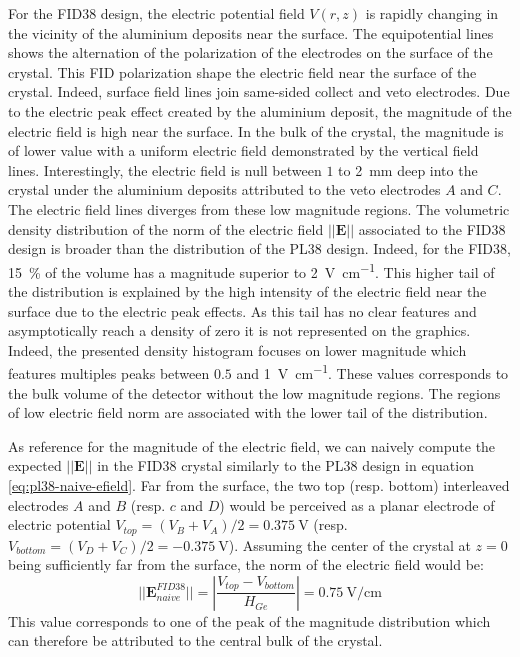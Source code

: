 For the FID38 design, the electric potential field $V(r,z)$ is rapidly changing in the vicinity of the aluminium deposits near the surface. The equipotential lines shows the alternation of the polarization of the electrodes on the surface of the crystal. This FID polarization shape the electric field near the surface of the crystal. Indeed, surface field lines join same-sided collect and veto electrodes. Due to the electric peak effect created by the aluminium deposit, the magnitude of the electric field is high near the surface. In the bulk of the crystal, the magnitude is of lower value with a uniform electric field demonstrated by the vertical field lines. Interestingly, the electric field is null between $1$ to \SI{2}{\mm} deep into the crystal under the aluminium deposits attributed to the veto electrodes $A$ and $C$. The electric field lines diverges from these low magnitude regions.
The volumetric density distribution of the norm of the electric field $||\bm{E}||$ associated to the FID38 design is broader than the distribution of the PL38 design. Indeed, for the FID38, \SI{15}{\percent} of the volume has a magnitude superior to \SI{2}{\volt\per\cm}. This higher tail of the distribution is explained by the high intensity of the electric field near the surface due to the electric peak effects. As this tail has no clear features and asymptotically reach a density of zero it is not represented on the graphics. Indeed, the presented density histogram focuses on lower magnitude which features multiples peaks between $0.5$ and \SI{1}{\volt\per\cm}. These values corresponds to the bulk volume of the detector without the low magnitude regions. The regions of low electric field norm are associated with the lower tail of the distribution.

As reference for the magnitude of the electric field, we can naively compute the expected $||\bm{E}||$ in the FID38 crystal similarly to the PL38 design in equation \ref{eq:pl38-naive-efield}. Far from the surface, the two top (resp. bottom) interleaved electrodes $A$ and $B$ (resp. $c$ and $D$) would be perceived as a planar electrode of electric potential $V_{top} = (V_B + V_A)/2 = \SI{0.375}{\volt}$ (resp. $V_{bottom} = (V_D + V_C)/2 = -\SI{0.375}{\volt}$). Assuming the center of the crystal at $z=0$ being sufficiently far from the surface, the norm of the electric field would be:
\begin{equation}
\label{eq:fid38-naive-efield}
|| \bm{E}_{naive}^{FID38} || = \left| \frac{V_{top} - V_{bottom}}{H_{Ge}} \right| = \SI{0.75}{\volt\per\cm}
\end{equation}
This value corresponds to one of the peak of the magnitude distribution which can therefore be attributed to the central bulk of the crystal.

